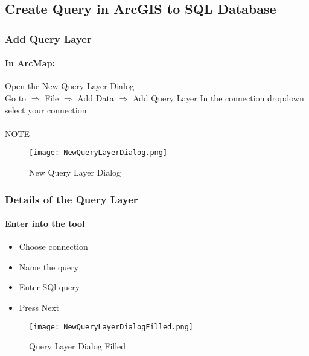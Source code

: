 %
%
%
%
% 
\subsection{Create Query in ArcGIS to SQL Database}
\medskip
\subsubsection[Add Query Layer ]{\Large Add Query Layer}
\paragraph*{In ArcMap: \texorpdfstring{\\}{}}
Open the New Query Layer Dialog\\
Go to $\Rightarrow$ File $\Rightarrow$ Add Data $\Rightarrow$ Add Query Layer
In the connection dropdown select your connection
\paragraph*{}NOTE
\begin{figure}[h!]
\centering
    \texttt{[image: NewQueryLayerDialog.png]}
\caption{New Query Layer Dialog}
\end{figure}
\clearpage
\subsubsection[Details of the Query Layer]{\Large Details of the Query Layer}
\paragraph*{Enter into the tool \texorpdfstring{\\}{}}
\begin{itemize}
  \item Choose connection
  \item Name the query
  \item Enter SQl query
  \item Press Next
\end{itemize}
\begin{figure}[h!]
\centering
    \texttt{[image: NewQueryLayerDialogFilled.png]}
\caption{Query Layer Dialog Filled}
\end{figure}
\clearpage
